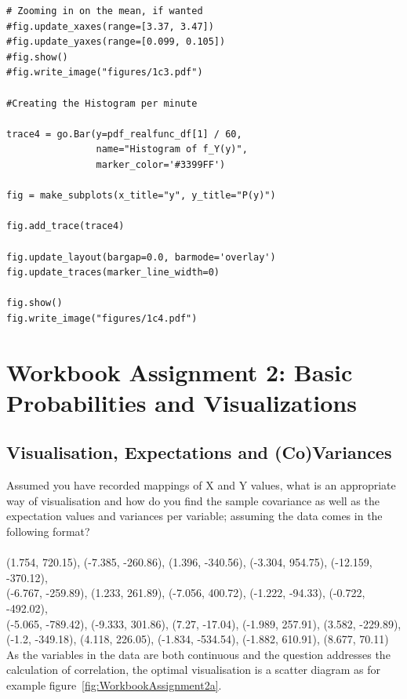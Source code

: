\begin{verbatim}
# Zooming in on the mean, if wanted
#fig.update_xaxes(range=[3.37, 3.47])
#fig.update_yaxes(range=[0.099, 0.105])
#fig.show()
#fig.write_image("figures/1c3.pdf")

#Creating the Histogram per minute

trace4 = go.Bar(y=pdf_realfunc_df[1] / 60,
                name="Histogram of f_Y(y)",
                marker_color='#3399FF')

fig = make_subplots(x_title="y", y_title="P(y)")

fig.add_trace(trace4)

fig.update_layout(bargap=0.0, barmode='overlay')
fig.update_traces(marker_line_width=0)

fig.show()
fig.write_image("figures/1c4.pdf")
\end{verbatim}



\chapter{Workbook Assignment 2: Basic Probabilities and Visualizations }	

\section{Visualisation, Expectations and (Co)Variances}
Assumed you have recorded mappings of X and Y values, what is an appropriate way of visualisation and how do you find the sample covariance as well as the expectation values and variances per variable; assuming the data comes in the following format?\\
\\
(1.754, 720.15), (-7.385, -260.86), (1.396, -340.56), (-3.304, 954.75), 
(-12.159, -370.12),\\ (-6.767, -259.89), (1.233, 261.89), (-7.056, 400.72), 
(-1.222, -94.33), (-0.722, -492.02),\\ (-5.065, -789.42), (-9.333, 301.86), 
(7.27, -17.04), (-1.989, 257.91), (3.582, -229.89), \\(-1.2, -349.18), 
(4.118, 226.05), (-1.834, -534.54), (-1.882, 610.91), (8.677, 70.11) \\

As the variables in the data are both continuous and the question addresses the calculation of correlation, the optimal visualisation is a scatter diagram as for example figure~\eqref{fig:WorkbookAssignment2a}.

